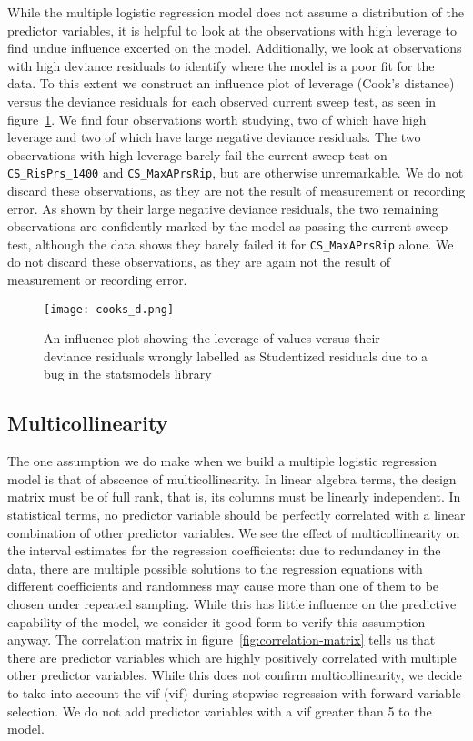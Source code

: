 While the multiple logistic regression model does not assume a distribution of the predictor variables, it is helpful to look at the observations with high leverage to find undue influence excerted on the model.
Additionally, we look at observations with high deviance residuals to identify where the model is a poor fit for the data.
To this extent we construct an influence plot of leverage (Cook's distance) versus the deviance residuals for each observed current sweep test, as seen in figure~\ref{fig:cooks-d}.
We find four observations worth studying, two of which have high leverage and two of which have large negative deviance residuals.
The two observations with high leverage barely fail the current sweep test on \texttt{CS\_RisPrs\_1400} and \texttt{CS\_MaxAPrsRip}, but are otherwise unremarkable.
We do not discard these observations, as they are not the result of measurement or recording error.
As shown by their large negative deviance residuals, the two remaining observations are confidently marked by the model as passing the current sweep test, although the data shows they barely failed it for \texttt{CS\_MaxAPrsRip} alone.
We do not discard these observations, as they are again not the result of measurement or recording error.

\begin{figure}
  \texttt{[image: cooks\_d.png]}
  \caption{An influence plot showing the leverage of values versus their deviance residuals wrongly labelled as Studentized residuals due to a bug in the statsmodels library}
  \label{fig:cooks-d}
\end{figure}

\subsection{Multicollinearity}

The one assumption we do make when we build a multiple logistic regression model is that of abscence of multicollinearity.
In linear algebra terms, the design matrix must be of full rank, that is, its columns must be linearly independent.
In statistical terms, no predictor variable should be perfectly correlated with a linear combination of other predictor variables.
We see the effect of multicollinearity on the interval estimates for the regression coefficients: due to redundancy in the data, there are multiple possible solutions to the regression equations with different coefficients and randomness may cause more than one of them to be chosen under repeated sampling.
While this has little influence on the predictive capability of the model, we consider it good form to verify this assumption anyway.
The correlation matrix in figure~\ref{fig:correlation-matrix} tells us that there are predictor variables which are highly positively correlated with multiple other predictor variables.
While this does not confirm multicollinearity, we decide to take into account the \acrlong{vif} (\acrshort{vif}) during stepwise regression with forward variable selection.
We do not add predictor variables with a \acrshort{vif} greater than 5 to the model.


